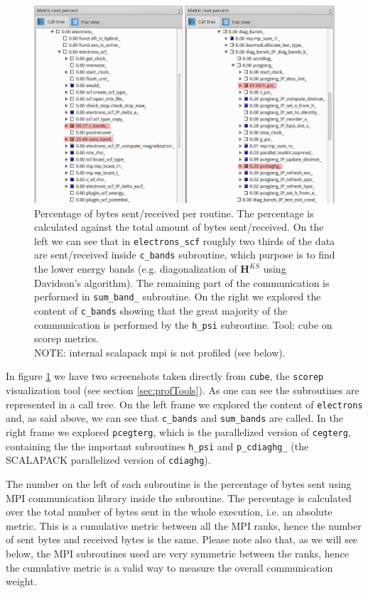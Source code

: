 \documentclass[a4paper,12pt]{article}
\newcommand\mf[1]{\mathbf{#1}}
\begin{document}
\begin{figure}[hhh!]
	\centerline{\includegraphics[scale=0.5]{cube_MPI.png}}
	\caption{Percentage of bytes sent/received per routine. The percentage is calculated against the total amount of bytes sent/received.  
	On the left we can see that in \texttt{electrons\_scf} roughly two thirds of the data are sent/received inside \texttt{c\_bands} subroutine, which purpose is to find the lower energy bands (e.g. diagonalization of $\mf{H}^{KS}$ using Davidson's algorithm). The remaining part of the communication is performed in \texttt{sum\_band\_} subroutine.
	On the right we explored the content of \texttt{c\_bands} showing that the great majority of the communication is performed by the \texttt{h\_psi} subroutine. Tool: cube on scorep metrics.
	\\NOTE:  internal scalapack mpi is not profiled (see below).
	}
	\label{fig:cubeMPI}
\end{figure}

In figure \ref{fig:cubeMPI} we have two screenshots taken directly from \texttt{cube}, the \texttt{scorep} visualization tool (see section \ref{sec:profTools}).
As one can see the subroutines are represented in a call tree.
On the left frame we explored the content of \texttt{electrons} and, as said above, we can see that \texttt{c\_bands} and \texttt{sum\_bands} are called.
In the right frame we explored \texttt{pcegterg}, which is the parallelized version of \texttt{cegterg}, containing the the important subroutines \texttt{h\_psi} and \texttt{p\_cdiaghg\_} (the SCALAPACK parallelized version of \texttt{cdiaghg}).

The number on the left of each subroutine is the percentage of bytes sent using MPI communication library inside the subroutine. 
The percentage is calculated over the total number of bytes sent in the whole execution, i.e. an absolute metric.
This is a cumulative metric between all the MPI ranks, hence the number of sent bytes and received bytes is the same.
Please note also that, as we will see below, the MPI subroutines used are very symmetric between the ranks, hence the cumulative metric is a valid way to measure the overall communication weight.
\end{document}
